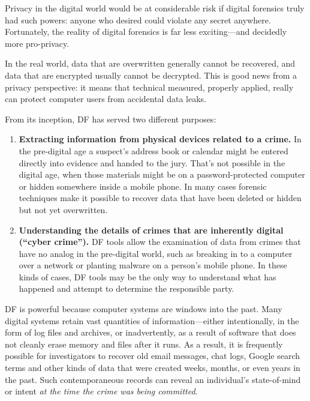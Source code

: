 Privacy in the digital world would be at considerable risk if digital
forensics truly had such powers: anyone who desired could violate any
secret anywhere. Fortunately, the reality of digital forensics is far
less exciting---and decidedly more pro-privacy.

In the real world, data that are overwritten generally cannot be
recovered, and data that are encrypted usually cannot be
decrypted. This is good news from a privacy perspective: it means that
technical measured, properly applied, really can protect computer
users from accidental data leaks. 

From its inception, DF has served two different purposes:

\begin{enumerate}
\item \textbf{Extracting information from physical devices related to
  a crime.} In the pre-digital age a suspect's address book or
calendar might be entered directly into evidence and handed to the
jury. That's not possible in the digital age, when those materials
might be on a password-protected computer or hidden somewhere inside a
mobile phone. In many cases forensic techniques make it possible to
recover data that have been deleted or hidden but not yet
overwritten. 

\item \textbf{Understanding the details of crimes that are inherently
  digital (``cyber crime'').} DF tools allow the examination of
data from crimes that have no analog in the pre-digital world, such as
breaking in to a computer over a network or planting malware on a
person's mobile phone. In these kinds of cases, DF tools may be the
only way to understand what has happened and attempt to determine the
responsible party. 

\end{enumerate}

DF is powerful because computer systems are windows into the
past. Many digital systems retain vast quantities of
information---either intentionally, in the form of log files and
archives, or inadvertently, as a result of software that does not
cleanly erase memory and files after it runs. As a result, it
is frequently possible for investigators to recover old email
messages, chat logs, Google search terms and other kinds of data
that were created
weeks, months, or even years in the past. Such contemporaneous records
can reveal an individual's state-of-mind or intent \emph{at the time
  the crime was being committed}.

